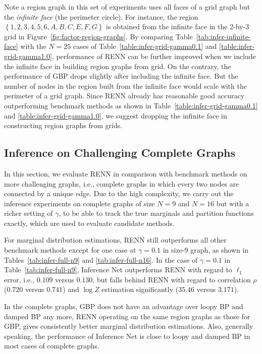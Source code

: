 \sloppy Note a region graph in this set of experiments uses all faces of a grid graph but the \textit{infinite face} (the perimeter circle). For instance, the region $\left\{1, 2, 3, 4, 5, 6, A, B, C ,E, F, G\right\}$ is obtained from the infinite face in the 2-by-3 grid in Figure~\ref{fig:factor-region-graphs}. By comparing Table~\ref{tab:infer-infinite-face} with the $N=25$ cases of Table~\ref{table:infer-grid-gamma0.1} and \ref{table:infer-grid-gamma1.0}, performance of RENN can be further improved when we include the infinite face in building region graphs from grid. On the contrary, the performance of GBP drops slightly after including the infinite face. But the number of nodes in the region built from the infinite face would scale with the perimeter of a grid graph. Since RENN already has reasonable good accuracy outperforming benchmark methods as shown in Table~\ref{table:infer-grid-gamma0.1} and \ref{table:infer-grid-gamma1.0}, we suggest dropping the infinite face in constructing region graphs from grids.


\subsection{Inference on Challenging Complete Graphs}

In this section, we evaluate RENN in comparison with benchmark methods on more challenging graphs, i.e., complete graphs in which every two nodes are connected by a unique edge. Due to the high complexity, we carry out the inference experiments on complete graphs of size $N=9$ and $N=16$ but with a richer setting of $\gamma$, to be able to track the true marginals and partition functions exactly, which are used to evaluate candidate methods.

For marginal distribution estimations, RENN still outperforms all other benchmark methods except for one case at $\gamma=0.1$ in size-$9$ graph, as shown in Tables~\ref{tab:infer-full-n9} and \ref{tab:infer-full-n16}. In the case of $\gamma=0.1$ in Table~\ref{tab:infer-full-n9}, Inference Net outperforms RENN with regard to $\ell_1$ error, i.e., $0.109$ versus $0.130$, but falls behind RENN with regard to correlation $\rho$ ($0.720$ versus $0.741$) and $\log{Z}$ estimation significantly ($35.46$ versus $3.171$).

In the complete graphs, GBP does not have an advantage over loopy BP and damped BP any more, RENN operating on the same region graphs as those for GBP, gives consistently better marginal distribution estimations. Also, generally speaking, the performance of Inference Net is close to loopy and damped BP in most cases of complete graphs.

